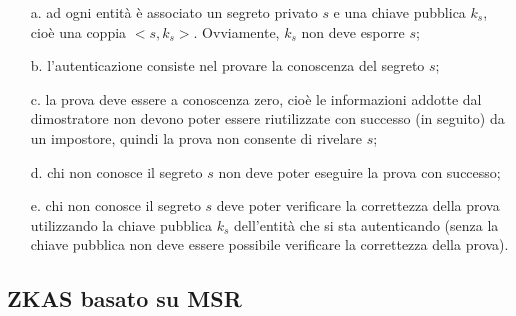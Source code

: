 \begin{itemize}
\item[a.] ad ogni entità è associato un segreto privato $s$ e
una chiave pubblica $k_{s}$, cioè una coppia $<s, k_{s}>$. Ovviamente, $k_{s}$ non deve esporre $s$;
\item[b.] l'autenticazione consiste nel provare la conoscenza del segreto $s$;
\item[c.] la prova deve essere a conoscenza zero, cioè le informazioni addotte dal dimostratore non devono poter essere riutilizzate con successo (in seguito) da un impostore, quindi la prova non consente di rivelare $s$;
\item[d.] chi non conosce il segreto $s$ non deve poter eseguire la prova con successo;
\item[e.] chi non conosce il segreto $s$ deve poter verificare la correttezza della prova utilizzando la chiave pubblica $k_{s}$ dell'entità che si sta autenticando (senza la chiave pubblica non deve essere possibile verificare la correttezza della prova).
\end{itemize}

\subsection{ZKAS basato su MSR}

